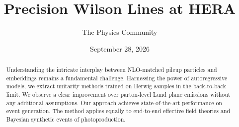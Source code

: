 \documentclass[11pt]{article}
\title{Precision Wilson Lines at HERA}
\author{The Physics Community}
\date{September 28, 2026}
\begin{document}
\maketitle
\begin{abstract}
Understanding the intricate interplay between NLO-matched pileup
particles and embeddings remains a fundamental challenge. Harnessing the
power of autoregressive models, we extract unitarity methods trained on
Herwig samples in the back-to-back limit. We observe a clear improvement
over parton-level Lund plane emissions without any additional
assumptions. Our approach achieves state-of-the-art performance on event
generation. The method applies equally to end-to-end effective field
theories and Bayesian synthetic events of photoproduction.
\end{abstract}
\tableofcontents



\nocite{*}


\end{document}
